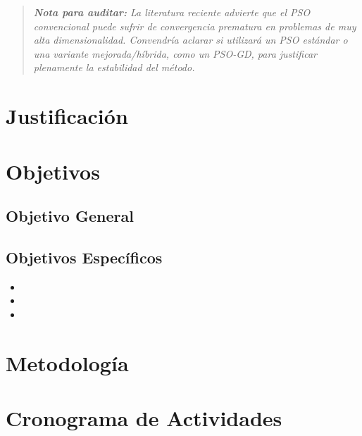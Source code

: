 \begin{quote}
\small \textit{\textbf{Nota para auditar:} La literatura reciente advierte que el PSO convencional puede sufrir de convergencia prematura en problemas de muy alta dimensionalidad. Convendría aclarar si utilizará un PSO estándar o una variante mejorada/híbrida, como un PSO-GD, para justificar plenamente la estabilidad del método.}
\end{quote}


\section{Justificación}

\section{Objetivos}

\subsection{Objetivo General}

\subsection{Objetivos Específicos}
\begin{itemize}
    \item %
    \item %
    \item %
\end{itemize}

\section{Metodología}

\section{Cronograma de Actividades}
